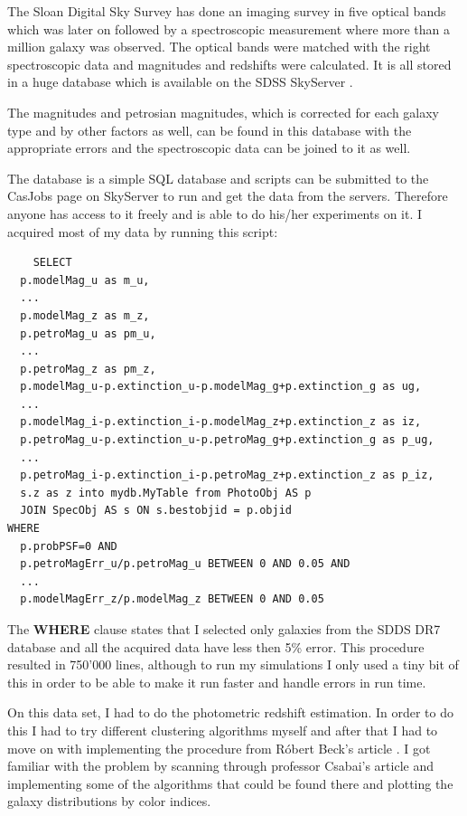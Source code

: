 \documentclass[a4paper,12pt]{article}
\begin{document}
\par The Sloan Digital Sky Survey has done an imaging
survey in five optical bands which was later on followed
by a spectroscopic measurement where more than a million galaxy
was observed. The optical bands were matched with the right spectroscopic
data and magnitudes and redshifts were calculated. It is all stored
in a huge database which is available on the SDSS SkyServer \cite{server}.

\par The magnitudes and petrosian magnitudes, which is corrected for
each galaxy type and by other factors as well, can be found in this database
with the appropriate errors and the spectroscopic data can be joined to it as
well.

\par The database is a simple SQL database and scripts can be submitted
to the CasJobs page on SkyServer to run and get the data from the servers.
Therefore anyone has access to it freely and is able to do his/her
experiments on it. I acquired most of my data by running this script:

\lstset{language=SQL}
\lstset{frame=lines}
\lstset{basicstyle=\footnotesize}
\begin{lstlisting}
    SELECT
  p.modelMag_u as m_u,
  ...
  p.modelMag_z as m_z,
  p.petroMag_u as pm_u,
  ...
  p.petroMag_z as pm_z,
  p.modelMag_u-p.extinction_u-p.modelMag_g+p.extinction_g as ug,
  ...
  p.modelMag_i-p.extinction_i-p.modelMag_z+p.extinction_z as iz,
  p.petroMag_u-p.extinction_u-p.petroMag_g+p.extinction_g as p_ug,
  ...
  p.petroMag_i-p.extinction_i-p.petroMag_z+p.extinction_z as p_iz,
  s.z as z into mydb.MyTable from PhotoObj AS p
  JOIN SpecObj AS s ON s.bestobjid = p.objid
WHERE
  p.probPSF=0 AND
  p.petroMagErr_u/p.petroMag_u BETWEEN 0 AND 0.05 AND
  ...
  p.modelMagErr_z/p.modelMag_z BETWEEN 0 AND 0.05
\end{lstlisting}

\par The \textbf{WHERE} clause states that I selected only
galaxies from the SDDS DR7 database and all the acquired data
have less then 5\% error. This procedure resulted in 750'000
lines, although to run my simulations I only used a tiny bit of
this in order to be able to make it run faster and handle errors
in run time.

\par On this data set, I had to do the photometric
redshift estimation. In order to do this I had to try
different clustering algorithms myself and after that I
had to move on with implementing the procedure from Róbert
Beck's article \cite{beck}. I got familiar with the problem
by scanning through professor Csabai's article \cite{csabai}
and implementing some of the algorithms that could be found
there and plotting the galaxy distributions by color indices.
\end{document}
